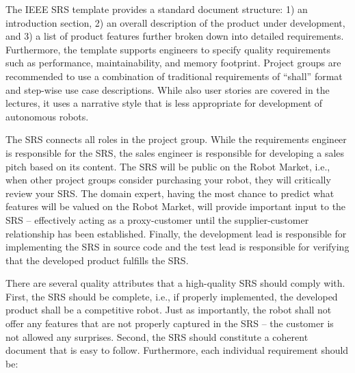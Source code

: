\documentclass{scrreprt}
\begin{document}
The IEEE SRS template provides a standard document structure: 1) an introduction section, 2) an overall description of the product under development, and 3) a list of product features further broken down into detailed requirements. Furthermore, the template supports engineers to specify quality requirements such as performance, maintainability, and memory footprint. Project groups are recommended to use a combination of traditional requirements of ``shall'' format and step-wise use case descriptions. While also user stories are covered in the lectures, it uses a narrative style that is less appropriate for development of autonomous robots.

The SRS connects all roles in the project group. While the requirements engineer is responsible for the SRS, the sales engineer is responsible for developing a sales pitch based on its content. The SRS will be public on the Robot Market, i.e., when other project groups consider purchasing your robot, they will critically review your SRS. The domain expert, having the most chance to predict what features will be valued on the Robot Market, will provide important input to the SRS -- effectively acting as a proxy-customer until the supplier-customer relationship has been established. Finally, the development lead is responsible for implementing the SRS in source code and the test lead is responsible for verifying that the developed product fulfills the SRS.

There are several quality attributes that a high-quality SRS should comply with. First, the SRS should be complete, i.e., if properly implemented, the developed product shall be a competitive robot. Just as importantly, the robot shall not offer any features that are not properly captured in the SRS -- the customer is not allowed any surprises. Second, the SRS should constitute a coherent document that is easy to follow. Furthermore, each individual requirement should be:
\end{document}
